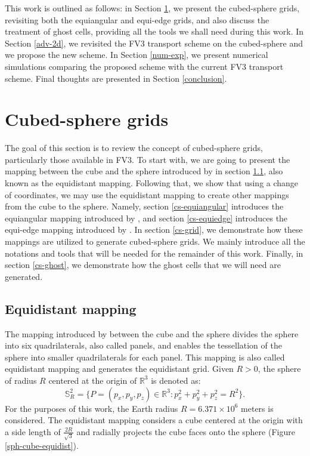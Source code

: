 \documentclass[preprint,12pt]{elsarticle}
\begin{document}
\begin{linenumbers}
This work is outlined as follows:
in Section \ref{cs-grids}, we present the cubed-sphere grids, revisiting both the equiangular and equi-edge grids, and also discuss the treatment of ghost cells, providing all the tools we shall need during this work.
In Section \ref{adv-2d}, we revisited the FV3 transport scheme on the cubed-sphere and we propose the new scheme.
In Section \ref{num-exp}, we present numerical simulations comparing the proposed scheme with the current FV3 transport scheme. 
Final thoughts are presented in Section \ref{conclusion}.

\newpage
\section{Cubed-sphere grids}
\label{cs-grids}
The goal of this section is to review the concept of cubed-sphere grids, particularly those available in FV3.
To start with, we are going to present the mapping between the cube and the sphere introduced by \cite{sadourny:1972} in section \ref{cs-equidistant}, also known as the equidistant mapping.
Following that, we show that using a change of coordinates, we may use the equidistant mapping to create other mappings from the cube to the sphere.
Namely, section \ref{cs-equiangular} introduces the equiangular mapping introduced by \cite{ronchi:1996}, and section \ref{cs-equiedge} introduces the equi-edge mapping introduced by \cite{chen:2021}. 
In section \ref{cs-grid}, we demonstrate how these mappings are utilized to generate cubed-sphere grids. 
We mainly introduce all the notations and tools that will be needed for the remainder of this work.
Finally, in section \ref{cs-ghost}, we demonstrate how the ghost cells that we will need are generated.

\subsection{Equidistant mapping}
\label{cs-equidistant}
The mapping introduced by \cite{sadourny:1972} between the cube and the sphere divides the sphere into six quadrilaterals, also called panels, and enables the tessellation of the sphere into smaller quadrilaterals for each panel.
This mapping is also called equidistant mapping and generates the equidistant grid.
Given $R>0$, the sphere of radius $R$ 
centered at the origin of  $\mathbb{R}^3$ is denoted as:
\begin{equation}
	\label{s2_r}
	\mathbb{S}^2_R = \{ P = (p_x,p_y,p_z) \in \mathbb{R}^3: p_x^2 + p_y^2 + p_z^2 = R^2\}.
\end{equation}
For the purposes of this work, the Earth radius $R=6.371\times 10^6$ meters is considered.
The equidistant mapping considers a cube centered at the origin with a side length of $\frac{2R}{\sqrt{3}}$ and radially projects the cube faces onto the sphere (Figure \ref{sph-cube-equidist}).


\end{linenumbers}
\end{document}
